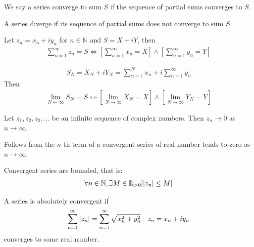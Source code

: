 \documentclass[12pt, english]{book}
\makeatletter
\renewenvironment{proof}[1][\proofname]{\par
	\pushQED{\qed}%
	\normalfont \topsep6\p@\@plus6\p@\relax
	\list{}{%
		\settowidth{\leftmargin}{\itshape\proofname:\hskip\labelsep}%
		\setlength{\labelwidth}{0pt}%
		\setlength{\itemindent}{-\leftmargin}%
		}%
	\item[\hskip\labelsep\itshape#1\@addpunct{:}]\ignorespaces
	}{\popQED\endlist\@endpefalse}
\makeatother
\begin{document}
	\begin{definition}
		We say a series converge to sum \(S\) if the sequence of partial sums converges to \(S\).
	\end{definition}

	\begin{definition}
		A series diverge if its sequence of partial sums does not converge to sum \(S\).
	\end{definition}
	
	\begin{theorem}
		Let \(z_n = x_n + iy_n\) for \(n \in \mathbb{N}\) and \(S = X + iY\), then
		\begin{align*}
			\sum_{n = 1}^{\infty} z_n = S 
			\iff \left[ \sum_{n = 1}^{\infty} x_n = X \right] \land 
				 \left[ \sum_{n = 1}^{\infty} y_n = Y \right]
		\end{align*}
	\end{theorem}
	\begin{proof}
		\begin{align*}
			S_N = X_N + iY_N = \sum_{n=1}^{N} x_n + i \sum_{n=1}^{\infty} y_n
		\end{align*}
		Then
		\begin{align*}
			\lim_{N \leftarrow \infty} S_N = S 
			\iff \left[ \lim_{N \rightarrow \infty} X_N = X  \right]
			\land  \left[ \lim_{N \rightarrow \infty} Y_N = Y  \right]
		\end{align*}
	\end{proof}

	\begin{corollary}
		Let \(z_1, z_2, z_3, \ldots \) be an infinite sequence of complex numbers. Then \(z_n \rightarrow 0\) as \(n \rightarrow \infty\).
	\end{corollary}
	\begin{proof}
		Follows from the \(n\)-th term of a convergent series of real number tends to zero as \(n \rightarrow \infty\).
	\end{proof}
	
	\begin{corollary}
		Convergent series are bounded, that is:
		\begin{align*}
			\forall n \in \mathbb{N}, \exists M \in \mathbb{R}_{>0} [\abs{z_n} \leq M]
		\end{align*}
	\end{corollary}
	
	\begin{definition}
		A series is absolutely convergent if
		\begin{align*}
			\sum_{n=1}^{\infty} \abs{z_n} &= \sum_{n=1}^{\infty} \sqrt{x_n^2 + y_n^2} 
				& z_n = x_n + iy_n
		\end{align*}
		converges to some real number. 
	\end{definition}
\end{document}
